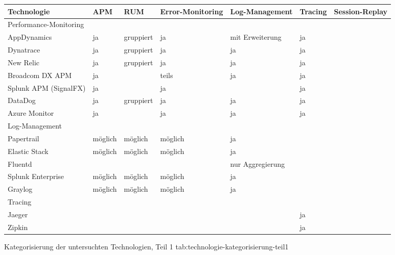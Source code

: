 %
{
\begin{tabular}{|p{2.25cm}|p{1.5cm}|p{2.0cm}|p{3.0cm}|p{3.0cm}|p{1.5cm}|p{2.5cm}|}
\hline
Technologie & APM & RUM & Error-Mo\-ni\-tor\-ing & Log-Management & Tracing & Session-Replay \\
\hline
\hline
\multicolumn{7}{|p{15.75cm}|}{Performance-Monitoring} \\
\hline
AppDynamics & ja & gruppiert & ja & mit Erweiterung & ja &  \\
\hline
Dynatrace & ja & gruppiert & ja & ja & ja &  \\
\hline
New Relic & ja & gruppiert & ja & ja & ja &  \\
\hline
Broadcom DX APM & ja &  & teils & ja & ja &  \\
\hline
Splunk APM (SignalFX) & ja &  & ja &  & ja &  \\
\hline
DataDog & ja & gruppiert & ja & ja & ja &  \\
\hline
Azure Monitor & ja &  & ja & ja & ja &  \\
\hline
\hline
\multicolumn{7}{|p{15.75cm}|}{Log-Management} \\
\hline
Papertrail & möglich & möglich & möglich & ja &  &  \\
\hline
Elastic Stack & möglich & möglich & möglich & ja &  &  \\
\hline
Fluentd &  &  &  & nur Aggregierung &  &  \\
\hline
Splunk \mbox{Enterprise} & möglich & möglich & möglich & ja &  &  \\
\hline
Graylog & möglich & möglich & möglich & ja &  &  \\
\hline
\hline
\multicolumn{7}{|p{15.75cm}|}{Tracing} \\
\hline
Jaeger &  &  &  &  & ja &  \\
\hline
Zipkin &  &  &  &  & ja &  \\
\hline
\end{tabular}
}
{Kategorisierung der untersuchten Technologien, Teil 1}
{tab:technologie-kategorisierung-teil1}

